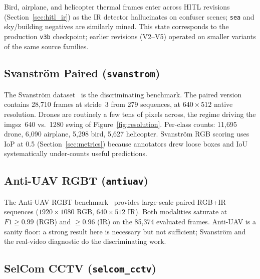 Bird, airplane, and helicopter thermal frames enter across HITL revisions (Section~\ref{sec:hitl_ir}) as the IR detector hallucinates on confuser scenes; \texttt{sea} and sky/building negatives are similarly mined. This state corresponds to the production \texttt{v3b} checkpoint; earlier revisions (V2--V5) operated on smaller variants of the same source families.

\subsection{Svanstr\"om Paired (\texttt{svanstrom})}
\label{sec:ds_svanstrom}

The Svanstr\"om dataset~\cite{svanstrom2021real,svanstrom2022dronedataset} is the discriminating benchmark. The paired version contains 28{,}710 frames at stride~3 from 279 sequences, at $640{\times}512$ native resolution. Drones are routinely a few tens of pixels across, the regime driving the imgsz~640 vs.~1280 swing of Figure~\ref{fig:resolution}. Per-class counts: 11{,}695 drone, 6{,}090 airplane, 5{,}298 bird, 5{,}627 helicopter. Svanstr\"om RGB scoring uses IoP at 0.5 (Section~\ref{sec:metrics}) because annotators drew loose boxes and IoU systematically under-counts useful predictions.

\subsection{Anti-UAV RGBT (\texttt{antiuav})}
\label{sec:ds_antiuav}

The Anti-UAV RGBT benchmark~\cite{jiang2021antiuav,zhao2023antiuav} provides large-scale paired RGB+IR sequences ($1920{\times}1080$ RGB, $640{\times}512$ IR). Both modalities saturate at $F1 \geq 0.99$ (RGB) and $\geq 0.96$ (IR) on the 85{,}374 evaluated frames. Anti-UAV is a sanity floor: a strong result here is necessary but not sufficient; Svanstr\"om and the real-video diagnostic do the discriminating work.

\subsection{SelCom CCTV (\texttt{selcom\_cctv})}
\label{sec:ds_selcom}

